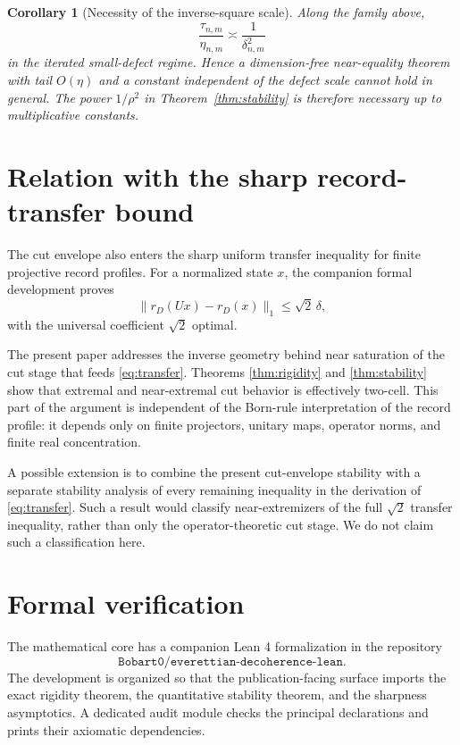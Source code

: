 \documentclass[11pt]{article}
\newtheorem{corollary}[theorem]{Corollary}
\newcommand{\dd}{\delta}
\newcommand{\etaq}{\eta}
\newcommand{\tauq}{\tau}
\begin{document}
\begin{corollary}[Necessity of the inverse-square scale]
Along the family above,
\[
  \frac{\tauq_{n,m}}{\etaq_{n,m}}
  \asymp \frac{1}{\dd_{n,m}^2}
\]
in the iterated small-defect regime.  Hence a dimension-free near-equality
theorem with tail $O(\etaq)$ and a constant independent of the defect scale
cannot hold in general.  The power $1/\rho^2$ in
Theorem~\ref{thm:stability} is therefore necessary up to multiplicative
constants.
\end{corollary}

\section{Relation with the sharp record-transfer bound}

The cut envelope also enters the sharp uniform transfer inequality for finite
projective record profiles.  For a normalized state $x$, the companion
formal development proves
\begin{equation}\label{eq:transfer}
  \|r_D(Ux)-r_D(x)\|_1
  \le
  \sqrt2\,\dd,
\end{equation}
with the universal coefficient $\sqrt2$ optimal.

The present paper addresses the inverse geometry behind near saturation of
the cut stage that feeds \eqref{eq:transfer}.  Theorems
\ref{thm:rigidity} and \ref{thm:stability} show that extremal and
near-extremal cut behavior is effectively two-cell.  This part of the
argument is independent of the Born-rule interpretation of the record
profile: it depends only on finite projectors, unitary maps, operator norms,
and finite real concentration.

A possible extension is to combine the present cut-envelope stability with a
separate stability analysis of every remaining inequality in the derivation
of \eqref{eq:transfer}.  Such a result would classify near-extremizers of the
full $\sqrt2$ transfer inequality, rather than only the operator-theoretic cut
stage.  We do not claim such a classification here.

\section{Formal verification}

The mathematical core has a companion Lean 4 formalization in the repository
\[
  \texttt{Bobart0/everettian-decoherence-lean}.
\]
The development is organized so that the publication-facing surface imports
the exact rigidity theorem, the quantitative stability theorem, and the
sharpness asymptotics.  A dedicated audit module checks the principal
declarations and prints their axiomatic dependencies.
\end{document}

